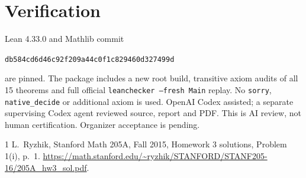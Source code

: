 \documentclass[11pt]{article}
\begin{document}
\section{Verification}
Lean 4.33.0 and Mathlib commit
\begin{center}\small\texttt{db584cd6d46c92f209a44c0f1c829460d327499d}\end{center}
are pinned. The package includes a new root build, transitive axiom
audits of all 15 theorems and full official
\texttt{leanchecker --fresh Main} replay. No \texttt{sorry},
\texttt{native\_decide} or additional axiom is used. OpenAI Codex
assisted; a separate supervising Codex agent reviewed source,
report and PDF. This is AI review, not human certification.
Organizer acceptance is pending.
\begin{thebibliography}{1}
 L.~Ryzhik, Stanford Math 205A, Fall 2015,
Homework 3 solutions, Problem 1(i), p.~1.
\url{https://math.stanford.edu/~ryzhik/STANFORD/STANF205-16/205A_hw3_sol.pdf}.
\end{thebibliography}
\end{document}
